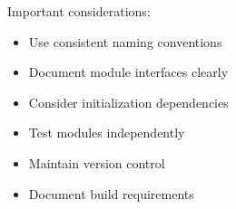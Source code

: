 \begin{remark}
Important considerations:
\begin{itemize}
  \item Use consistent naming conventions
  \item Document module interfaces clearly
  \item Consider initialization dependencies
  \item Test modules independently
  \item Maintain version control
  \item Document build requirements
\end{itemize}
\end{remark}